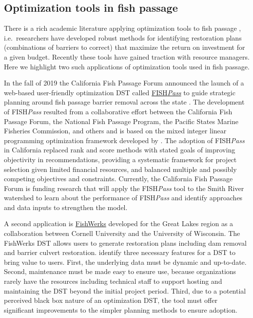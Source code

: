 \documentclass[12pt]{elsarticle}
\begin{document}
\subsection*{Optimization tools in fish passage}

There is a rich academic literature applying optimization tools to fish passage \citep{ohanley_optimizing_2005, kuby_multiobjective_2005, mcmanamay_commonalities_2019, couto_safeguarding_2021}, i.e.\ researchers have developed robust methods for identifying restoration plans (combinations of barriers to correct) that maximize the return on investment for a given budget. Recently these tools have gained traction with resource managers. Here we highlight two such applications of optimization tools used in fish passage. 

In the fall of 2019 the California Fish Passage Forum announced the launch of a web-based user-friendly optimization DST called \href{https://fishpass.psmfc.org}{FISH\emph{Pass}} to guide strategic planning around fish passage barrier removal across the state \citep{ohanley_optipass_2015}. The development of FISH\emph{Pass} resulted from a collaborative effort between the California Fish Passage Forum, the National Fish Passage Program, the Pacific States Marine Fisheries Commission, and others and is based on the mixed integer linear programming optimization framework developed by \citet{ohanley_optimizing_2005}. The adoption of FISH\emph{Pass} in California replaced rank and score methods with stated goals of improving objectivity in recommendations, providing a systematic framework for project selection given limited financial resources, and balanced multiple and possibly competing objectives and constraints. Currently, the California Fish Passage Forum is funding research that will apply the FISH\emph{Pass} tool to the Smith River watershed to learn about the performance of FISH\emph{Pass} and identify approaches and data inputs to strengthen the model.\footnotemark{} 

A second application is \href{https://greatlakesconnectivity.org}{FishWerks} developed for the Great Lakes region as a collaboration between Cornell University and the University of Wisconsin. The FishWerks DST allows users to generate restoration plans including dam removal and barrier culvert restoration. \citet{moody_pet_2017} identify three necessary features for a DST to bring value to users. First, the underlying data must be dynamic and up-to-date. Second, maintenance must be made easy to ensure use, because organizations rarely have the resources including technical staff to support hosting and maintaining the DST beyond the initial project period. Third, due to a potential perceived black box nature of an optimization DST, the tool must offer significant improvements to the simpler planning methods to ensure adoption. 
\end{document}
